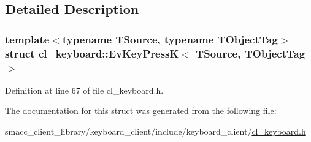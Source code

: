 \subsection{Detailed Description}
\subsubsection*{template$<$typename T\+Source, typename T\+Object\+Tag$>$\newline
struct cl\+\_\+keyboard\+::\+Ev\+Key\+Press\+K$<$ T\+Source, T\+Object\+Tag $>$}



Definition at line 67 of file cl\+\_\+keyboard.\+h.



The documentation for this struct was generated from the following file\+:\begin{DoxyCompactItemize}
\item 
smacc\+\_\+client\+\_\+library/keyboard\+\_\+client/include/keyboard\+\_\+client/\hyperlink{cl__keyboard_8h}{cl\+\_\+keyboard.\+h}\end{DoxyCompactItemize}
